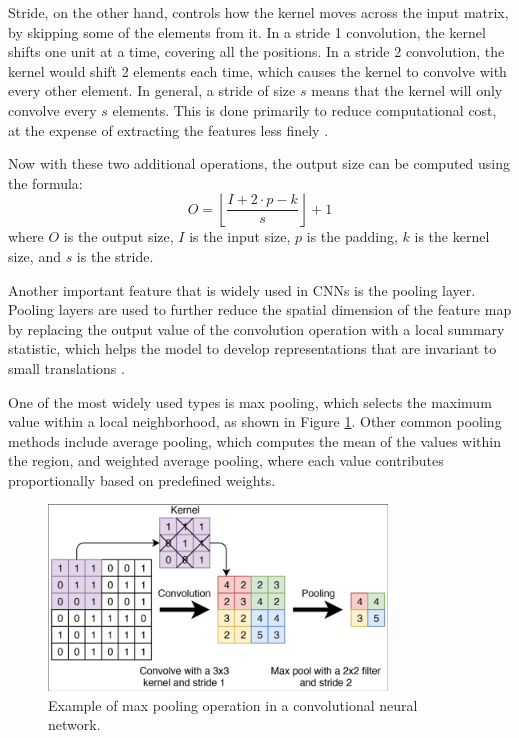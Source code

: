 Stride, on the other hand, controls how the kernel moves across the input matrix, by skipping some of the elements from it. In a stride 1 convolution, the kernel shifts one unit at a time, covering all the positions. In a stride 2 convolution, the kernel would shift 2 elements each time, which causes the kernel to convolve with every other element. In general, a stride of size $s$ means that the kernel will only convolve every $s$ elements. This is done primarily to reduce computational cost, at the expense of extracting the features less finely \cite{Goodfellow_Bengio_Courville_2018}. 

Now with these two additional operations, the output size can be computed using the formula:
\begin{equation}
    O = \left\lfloor \frac{I + 2 \cdot p - k}{s} \right\rfloor + 1
    \label{eq:conv_output}
\end{equation}
where $O$ is the output size, $I$ is the input size, $p$ is the padding, $k$ is the kernel size, and $s$ is the stride.

Another important feature that is widely used in CNNs is the pooling layer. Pooling layers are used to further reduce the spatial dimension of the feature map by replacing the output value of the convolution operation with a local summary statistic, which helps the model to develop representations that are invariant to small translations \cite{Goodfellow_Bengio_Courville_2018}. 

One of the most widely used types is max pooling, which selects the maximum value within a local neighborhood, as shown in Figure \ref{fig:pooling-example}. Other common pooling methods include average pooling, which computes the mean of the values within the region, and weighted average pooling, where each value contributes proportionally based on predefined weights.

\begin{figure}[H]
    \centering
    \includegraphics[width=9cm]{Cap2_LitReview/model_basics/Convolutional_NN/Schematic-representation-of-a-convolution-and-pooling-layer-in-a-CNN.png}
    \caption{Example of max pooling operation in a convolutional neural network. \cite{Verschoof-van}}
    \label{fig:pooling-example}
\end{figure}

